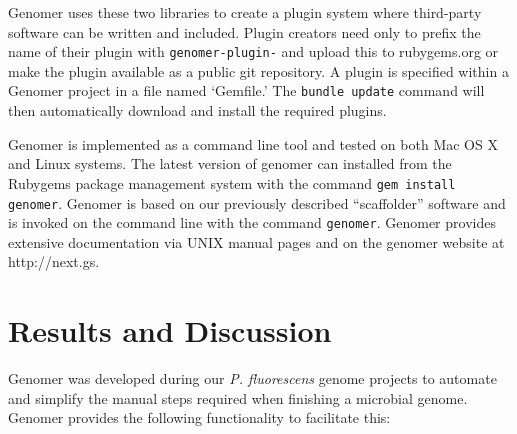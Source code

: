 \documentclass[10pt]{article}
\begin{document}
Genomer uses these two libraries to create a plugin system where third-party
software can be written and included. Plugin creators need only to prefix the
name of their plugin with \verb+genomer-plugin-+ and upload this to
rubygems.org or make the plugin available as a public git repository. A plugin
is specified within a Genomer project in a file named `Gemfile.' The
\verb+bundle update+ command will then automatically download and install the
required plugins.

Genomer is implemented as a command line tool and tested on both Mac OS X and
Linux systems. The latest version of genomer can installed from the Rubygems
package management system with the command \verb+gem install genomer+. Genomer
is based on our previously described ``scaffolder'' software and is invoked on
the command line with the command \verb+genomer+. Genomer provides extensive
documentation via UNIX manual pages and on the genomer website at
http://next.gs.

\section*{Results and Discussion}

Genomer was developed during our \emph{P. fluorescens} genome projects to
automate and simplify the manual steps required when finishing a microbial
genome. Genomer provides the following functionality to facilitate this:
\end{document}
